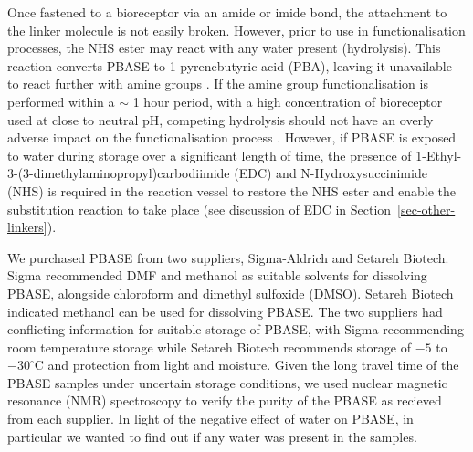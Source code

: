 \documentclass[
  a4paper,
]{scrbook}
\begin{document}
Once fastened to a bioreceptor via an amide or imide bond, the
attachment to the linker molecule is not easily broken. However, prior
to use in functionalisation processes, the NHS ester may react with any
water present (hydrolysis). This reaction converts PBASE to
1-pyrenebutyric acid (PBA), leaving it unavailable to react further with
amine groups \autocite{Hermanson2013-3,Hermanson2013-5,Mishyn2022}. If
the amine group functionalisation is performed within a \(\sim\) 1 hour
period, with a high concentration of bioreceptor used at close to
neutral pH, competing hydrolysis should not have an overly adverse
impact on the functionalisation process \autocite{Hermanson2013-3}.
However, if PBASE is exposed to water during storage over a significant
length of time, the presence of
1-Ethyl-3-(3-dimethylaminopropyl)carbodiimide (EDC) and
N-Hydroxysuccinimide (NHS) is required in the reaction vessel to restore
the NHS ester and enable the substitution reaction to take place (see
discussion of EDC in Section~\ref{sec-other-linkers}).

We purchased PBASE from two suppliers, Sigma-Aldrich and Setareh
Biotech. Sigma recommended DMF and methanol as suitable solvents for
dissolving PBASE, alongside chloroform and dimethyl sulfoxide (DMSO).
Setareh Biotech indicated methanol can be used for dissolving PBASE. The
two suppliers had conflicting information for suitable storage of PBASE,
with Sigma recommending room temperature storage while Setareh Biotech
recommends storage of \(-5\) to \(-30 ^\circ \text{C}\) and protection
from light and moisture. Given the long travel time of the PBASE samples
under uncertain storage conditions, we used nuclear magnetic resonance
(NMR) spectroscopy to verify the purity of the PBASE as recieved from
each supplier. In light of the negative effect of water on PBASE, in
particular we wanted to find out if any water was present in the
samples.
\end{document}
